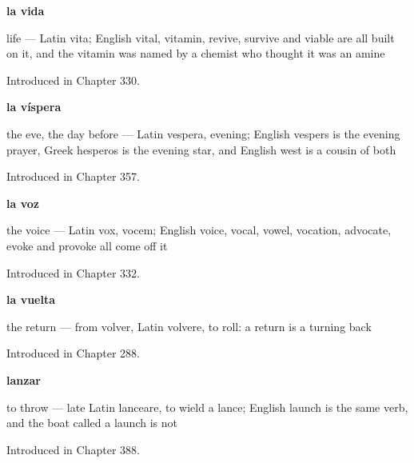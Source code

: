 \noindent\begin{minipage}[t]{\linewidth}
\raggedright
\textbf{la vida}\par
\small life — Latin vita; English vital, vitamin, revive, survive and viable are all built on it, and the vitamin was named by a chemist who thought it was an amine\par
\footnotesize Introduced in Chapter 330.
\end{minipage}\par\medskip

\noindent\begin{minipage}[t]{\linewidth}
\raggedright
\textbf{la víspera}\par
\small the eve, the day before — Latin vespera, evening; English vespers is the evening prayer, Greek hesperos is the evening star, and English west is a cousin of both\par
\footnotesize Introduced in Chapter 357.
\end{minipage}\par\medskip

\noindent\begin{minipage}[t]{\linewidth}
\raggedright
\textbf{la voz}\par
\small the voice — Latin vox, vocem; English voice, vocal, vowel, vocation, advocate, evoke and provoke all come off it\par
\footnotesize Introduced in Chapter 332.
\end{minipage}\par\medskip

\noindent\begin{minipage}[t]{\linewidth}
\raggedright
\textbf{la vuelta}\par
\small the return — from volver, Latin volvere, to roll: a return is a turning back\par
\footnotesize Introduced in Chapter 288.
\end{minipage}\par\medskip

\noindent\begin{minipage}[t]{\linewidth}
\raggedright
\textbf{lanzar}\par
\small to throw — late Latin lanceare, to wield a lance; English launch is the same verb, and the boat called a launch is not\par
\footnotesize Introduced in Chapter 388.
\end{minipage}\par\medskip

